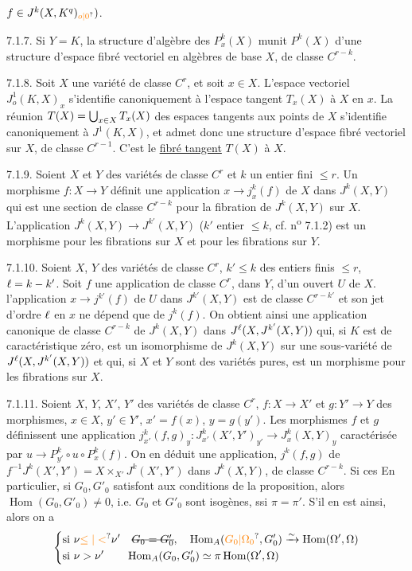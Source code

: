 $f\in J^k(X,K^q)_{\unsure{o|0}})$.

7.1.7. Si $Y=K$, la structure d'algèbre des $P^k_x(X)$ munit $P^k(X)$ d'une structure d'espace fibré vectoriel en algèbres de base $X$, de classe $C^{r-k}$.

7.1.8. Soit $X$ une variété de classe $C^r$, et soit $x\in X$. L'espace vectoriel $J^{1}_{o}(K,X)_x$ s'identifie canoniquement à l'espace tangent $T_x(X)$ à $X$ en $x$. La réunion $T(X)=\bigcup_{x\in X}T_x(X)$ des espaces tangents aux points de $X$ s'identifie canoniquement à $J^{1}(K,X)$, et admet donc une structure d'espace fibré vectoriel sur $X$, de classe $C^{r-1}$. C'est le \uline{fibré tangent} $T(X)$ à $X$.

7.1.9. Soient $X$ et $Y$ des variétés de classe $C^r$ et $k$ un entier fini $\leq r$. Un morphisme $f:X\longrightarrow Y$ définit une application $x\longrightarrow j^k_x(f)$ de $X$ dans $J^k(X,Y)$ qui est une section de classe $C^{r-k}$ pour la fibration de $J^k(X,Y)$ sur $X$. L'application $J^k(X,Y)\longrightarrow J^{k'}(X,Y)$ ($k'$ entier $\leq k$, cf. n\textsuperscript{o} 7.1.2) est un morphisme pour les fibrations sur $X$ et pour les fibrations sur $Y$.

7.1.10. Soient $X$, $Y$ des variétés de classe $C^r$, $k'\leq k$ des entiers finis $\leq r$, $\ell=k-k'$. Soit $f$ une application de classe $C^r$, dans $Y$, d'un ouvert $U$ de $X$. l'application $x\longrightarrow j^{k'}(f)$ de $U$ dans $J^{k'}(X,Y)$ est de classe $C^{r-k'}$ et son jet d'ordre $\ell$ en $x$ ne dépend que de $j^k(f)$. On obtient ainsi une application canonique de classe $C^{r-k}$ de $J^k(X,Y)$ dans $J^{\ell}(X,J^{k'}(X,Y))$ qui, si $K$ est de caractéristique zéro, est un isomorphisme de $J^k(X,Y)$ sur une sous-variété de $J^{\ell}(X,J^{k'}(X,Y))$ et qui, si $X$ et $Y$ sont des variétés pures, est un morphisme pour les fibrations sur $X$.

7.1.11. Soient $X$, $Y$, $X'$, $Y'$ des variétés de classe $C^r$, $f:X\longrightarrow X'$ et $g:Y'\longrightarrow Y$ des morphismes, $x\in X$, $y'\in Y'$, $x'=f(x)$, $y=g(y')$. Les morphismes $f$ et $g$ définissent une application $j^k_{x'}(f,g)_y:J^k_{x'}(X',Y')_{y'}\longrightarrow J^k_x(X,Y)_y$ caractérisée par $u\longrightarrow P^k_{y'}\circ u\circ P^k_x(f)$. On en déduit une application, $j^k(f,g)$ de $f^{-1}J^k(X',Y')=X\times_{X'}J^k(X',Y')$ dans $J^k(X,Y)$, de classe $C^{r-k}$. Si ces
En particulier, si $G_0,G'_0$ satisfont aux conditions de la proposition, alors $\operatorname{Hom}(G_0,G'_0)\ne 0$, i.e. $G_0$ et $G'_0$ sont isogènes, ssi $\pi=\pi'$.  S'il en est ainsi, alors  on a
\[
\left\{\begin{aligned}
&\text{si }\nu\unsure{\leq|<}\nu'\quad\deleted{G_0=G'_0},\quad \operatorname{Hom}_A(\unsure{G_0|\Omega_0},G'_0)\xrightarrow{\sim}\operatorname{Hom}(\Omega',\Omega)\\
&\text{si }\nu>\nu'\qquad\operatorname{Hom}_A(G_0,G'_0)\simeq\pi\operatorname{Hom}(\Omega',\Omega)
\end{aligned}\right.
\]

